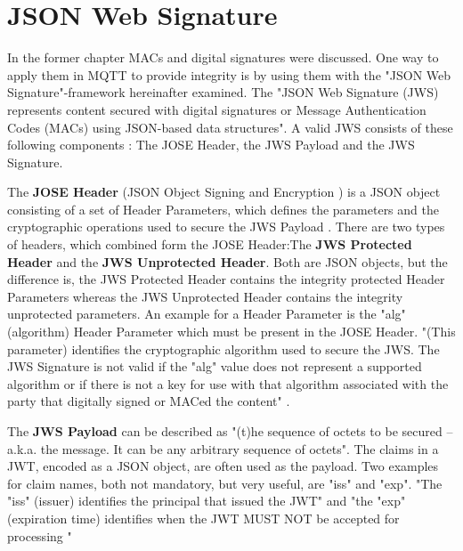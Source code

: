 \section{JSON Web Signature}

In the former chapter MACs and digital signatures were discussed. One way to apply them in MQTT to provide integrity is by using them with the "JSON Web Signature"-framework hereinafter examined. The
"JSON Web Signature (JWS) represents content secured with digital signatures or Message Authentication Codes (MACs) using JSON-based  data structures"\cite{rfc7515}.
A valid JWS consists of these following components : The JOSE Header, the JWS Payload and the JWS Signature.\cite{rfc7515}\newline

The \textbf{JOSE Header} (JSON Object Signing and Encryption ) is a JSON object consisting of a set of Header Parameters, which defines the parameters and the cryptographic operations used to secure the JWS Payload \cite{rfc7515}. There are two types of headers, which combined form the JOSE Header:\newline The \textbf{JWS Protected Header} and the \textbf{JWS Unprotected Header}.\newline
Both are JSON objects, but the difference is, the JWS Protected Header contains the integrity protected Header Parameters whereas the JWS Unprotected Header contains the integrity unprotected parameters.\newline
An example for a Header Parameter is the "alg" (algorithm) Header Parameter which must be present in the JOSE Header. "(This parameter) identifies the cryptographic algorithm used to secure the JWS. The JWS Signature is not valid if the "alg" value does not represent a supported algorithm or if there is not a key for use with that algorithm associated with the party that digitally signed or MACed the content" \cite{rfc7515}.\newline

The \textbf{JWS Payload} can be described as "(t)he sequence of octets to be secured -- a.k.a. the message. It can be any arbitrary sequence of octets"\cite{rfc7515}.\newline
The claims in a JWT, encoded as a JSON object, are often used as the payload. \cite{rfc7519}\newline
Two examples for claim names, both not mandatory, but very useful, are "iss" and "exp". "The "iss" (issuer) identifies the principal that issued the JWT" \cite{rfc7519} and "the "exp" (expiration time) identifies when the JWT MUST NOT be accepted for processing "\cite{rfc7519} \newline

